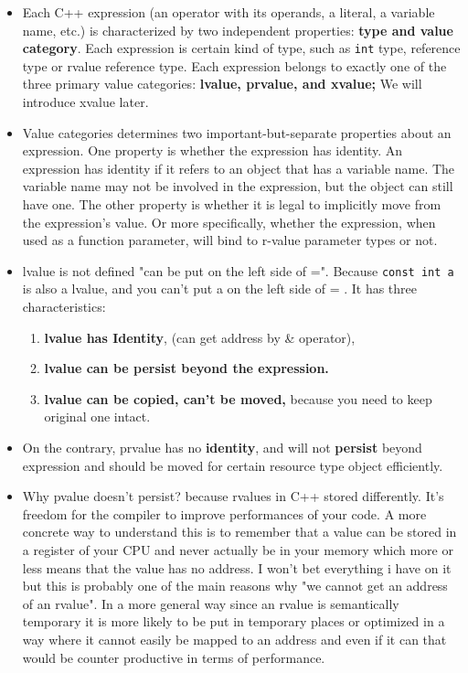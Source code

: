 \documentclass[a4paper,11pt,twoside]{book}
\begin{document}
\begin{itemize}

	\item Each C++ expression (an operator with its operands, a literal, a variable name, etc.) is characterized by two independent properties: \textbf{type and value category}. Each expression is certain kind of type, such as \texttt{int} type, reference type or rvalue reference type. Each expression belongs to exactly one of the three primary value categories: \textbf{lvalue, prvalue, and xvalue;} We will introduce xvalue later. 
			
    \item Value categories determines two important-but-separate properties about an expression. One property is whether the expression has identity. An expression has identity if it refers to an object that has a variable name. The variable name may not be involved in the expression, but the object can still have one. The other property is whether it is legal to implicitly move from the expression's value. Or more specifically, whether the expression, when used as a function parameter, will bind to r-value parameter types or not.

	\item lvalue is not defined "can be put on the left side of =". Because \texttt{const int a} is also a lvalue, and you can't put a on the left side of = . It has three characteristics:
\begin{enumerate}
	\item\textbf{lvalue has Identity}, (can get address by \& operator),
	\item \textbf{lvalue can be persist beyond the expression. }
	\item \textbf{lvalue can be copied, can't be moved,} because you need to keep original one intact.
\end{enumerate}

	\item On the contrary, prvalue has no \textbf{identity}, and will not \textbf{persist} beyond expression and should be moved for certain resource type object efficiently.

	\item Why pvalue doesn't persist? because rvalues in C++ stored differently. It's freedom for the compiler to improve performances of your code. A more concrete way to understand this is to remember that a value can be stored in a register of your CPU and never actually be in your memory which more or less means that the value has no address. I won't bet everything i have on it but this is probably one of the main reasons why "we cannot get an address of an rvalue". In a more general way since an rvalue is semantically temporary it is more likely to be put in temporary places or optimized in a way where it cannot easily be mapped to an address and even if it can that would be counter productive in terms of performance.


\end{itemize}
\end{document}
